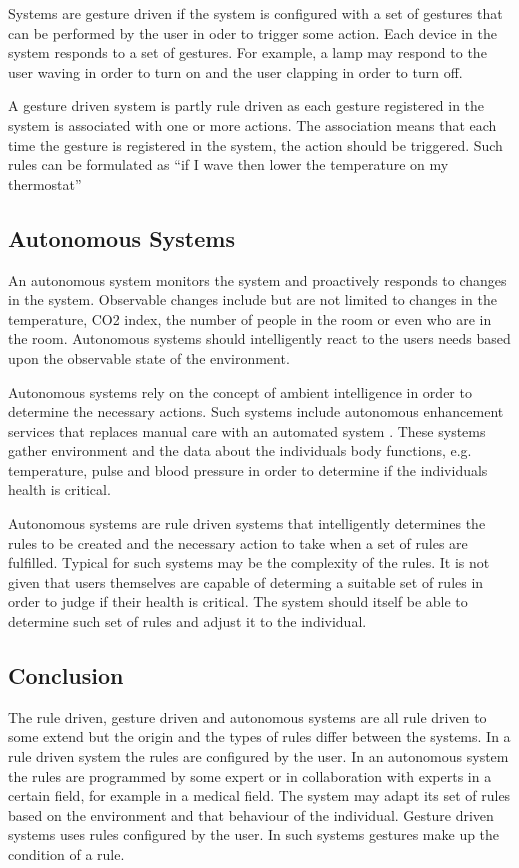 Systems are gesture driven if the system is configured with a set of gestures that can be performed by the user in oder to trigger some action. Each device in the system responds to a set of gestures. For example, a lamp may respond to the user waving in order to turn on and the user clapping in order to turn off.

A gesture driven system is partly rule driven as each gesture registered in the system is associated with one or more actions. The association means that each time the gesture is registered in the system, the action should be triggered. Such rules can be formulated as ``if I wave then lower the temperature on my thermostat''

\subsection{Autonomous Systems}

An autonomous system monitors the system and proactively responds to changes in the system. Observable changes include but are not limited to changes in the temperature, CO2 index, the number of people in the room or even who are in the room.
Autonomous systems should intelligently react to the users needs based upon the observable state of the environment.

Autonomous systems rely on the concept of ambient intelligence in order to determine the necessary actions. Such systems include autonomous enhancement services that replaces manual care with an automated system \cite{nehmer2006living}. These systems gather environment and the data about the individuals body functions, e.g. temperature, pulse and blood pressure in order to determine if the individuals health is critical.

Autonomous systems are rule driven systems that intelligently determines the rules to be created and the necessary action to take when a set of rules are fulfilled. Typical for such systems may be the complexity of the rules. It is not given that users themselves are capable of determing a suitable set of rules in order to judge if their health is critical. The system should itself be able to determine such set of rules and adjust it to the individual.

\subsection{Conclusion}

The rule driven, gesture driven and autonomous systems are all rule driven to some extend but the origin and the types of rules differ between the systems. In a rule driven system the rules are configured by the user.
In an autonomous system the rules are programmed by some expert or in collaboration with experts in a certain field, for example in a medical field. The system may adapt its set of rules based on the environment and that behaviour of the individual.
Gesture driven systems uses rules configured by the user. In such systems gestures make up the condition of a rule.

